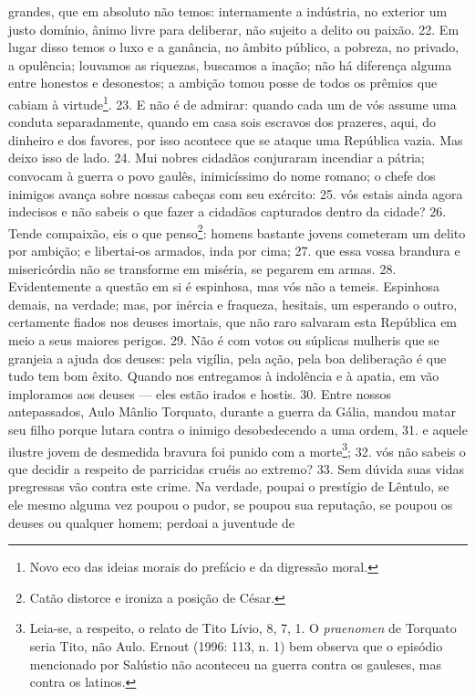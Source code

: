 grandes, que em absoluto não temos: internamente a indústria, no exterior um
justo domínio, ânimo livre para deliberar, não sujeito a delito ou paixão. 22.
Em lugar disso temos o luxo e a ganância, no âmbito público, a pobreza, no
privado, a opulência; louvamos as riquezas, buscamos a inação; não há diferença
alguma entre honestos e desonestos; a ambição tomou posse de todos os prêmios
que cabiam à virtude\footnote{Novo eco das ideias morais do prefácio  e da
digressão moral.}. 23. E não é de admirar: quando cada um de vós assume uma
conduta separadamente, quando em casa sois escravos dos prazeres, aqui, do
dinheiro e dos favores, por isso acontece que se ataque uma República vazia.
Mas deixo isso de lado. 24. Mui nobres cidadãos conjuraram incendiar a pátria;
convocam à guerra o povo gaulês, inimicíssimo do nome romano; o chefe dos
inimigos avança sobre nossas cabeças com seu exército: 25. vós estais ainda
agora indecisos e não sabeis o que fazer a cidadãos capturados dentro da
cidade? 26. Tende compaixão, eis o que penso\footnote{Catão distorce e ironiza
a posição de César.}: homens bastante jovens cometeram um delito por ambição; e
libertai-os armados, inda por cima; 27. que essa vossa brandura e misericórdia
não se transforme em miséria, se pegarem em armas. 28. Evidentemente a questão
em si é espinhosa, mas vós não a temeis. Espinhosa demais, na verdade; mas, por
inércia e fraqueza, hesitais, um esperando o outro, certamente fiados
nos deuses imortais, que não raro salvaram esta República em meio a seus
maiores perigos. 29. Não é com votos ou súplicas mulheris que se granjeia a
ajuda dos deuses: pela vigília, pela ação, pela boa deliberação é que tudo tem
bom êxito. Quando nos entregamos à indolência e à apatia, em vão imploramos aos
deuses --- eles estão irados e hostis. 30. Entre nossos antepassados, Aulo
Mânlio Torquato, durante a guerra da Gália, mandou matar seu filho porque
lutara contra o inimigo desobedecendo a uma ordem, 31. e aquele ilustre jovem
de desmedida bravura foi punido com a morte\footnote{Leia-se, a respeito, o
relato de Tito Lívio, 8, 7, 1. O \emph{praenomen} de Torquato seria Tito, não
Aulo. Ernout (1996: 113, n. 1) bem observa que o episódio mencionado por
Salústio não aconteceu na guerra contra os gauleses, mas contra os latinos.};
32. vós não sabeis o que decidir a respeito de parricidas cruéis ao extremo?
33. Sem dúvida suas vidas pregressas vão contra este crime. Na verdade, poupai
o prestígio de Lêntulo, se ele mesmo alguma vez poupou o pudor, se poupou sua
reputação, se poupou os deuses ou qualquer homem; perdoai a juventude de
